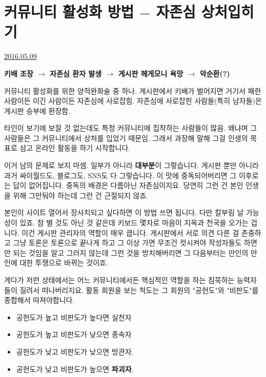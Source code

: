 
\section{커뮤니티 활성화 방법 $-$ 자존심 상처입히기}
\href{https://www.kockoc.com/Apoc/766833}{2016.05.09}

\vspace{5mm}

\textbf{키배 조장 $\rightarrow$ 자존심 환자 발생 $\rightarrow$ 게시판 헤게모니 욕망 $\rightarrow$ 악순환(?)}
\vspace{5mm}

커뮤니티 활성화를 위한 양적완화술 중 하나.
게시판에서 키배가 벌어지면 거기서 패한 사람이든 이긴 사람이든 자존심에 사로잡힘.
자존심에 사로잡힌 사람들(특히 남자들)은 게시판 승부에 환장함.
\vspace{5mm}

타인이 보기에 보잘 것 없는데도 특정 커뮤니티에 집착하는 사람들이 많음.
왜냐며 그 사람들은 그 커뮤니티에서 상처를 입었기 때문임.
그래서 과장해 말해 그걸 인생의 목표로 삼고 온라인 활동을 하기 시작합니다.
\vspace{5mm}

이거 남의 문제로 보지 마셈. 일부가 아니라 \textbf{대부분}이 그렇습니다.
게시판 뿐만 아니라 과거 싸이월드도, 블로그도, SNS도 다 그렇습니다.
이 맛에 중독되어버리면 그 이후로는 답이 없어집니다. 중독의 배경은 다름아닌 자존심이지요.
당연히 그런 건 본인 인생을 위해 그만둬야 하는데 그런 건 근절되지 않죠.
\vspace{5mm}

본인이 사이트 열어서 장사치되고 싶다하면 이 방법 쓰면 됩니다. 다만 칼부림 날 가능성이 있죠.
참 별 것도 아닌 것 같은데 키보드 몇자로 마음이 지옥과 천국을 오가는 겁니다.
이건 게시판 관리자의 역할이 매우 큽니다.
게시판에서 서로 의견 다른 걸 존중하고 그냥 토론은 토론으로 끝나게 하고 그 이상 가면 무조건 컷시켜야
작성자들도 하면 안 되는 것임을 알고 그러지 않는데
그런 것을 방치해버리면 그 다음부터는 만인의 만인에 대한 투쟁으로 바뀌는 것이죠.
\vspace{5mm}

게다가 저런 상태에서는 어느 커뮤니티에서든 핵심적인 역할을 하는 침묵하는 능력자들이 질려서 떠나버리지요.
활동 회원을 보는 척도는 그 회원의 "공헌도"와 "비판도"를 종합해서 따져야합니다.
\begin{itemize}
    \item[] 공헌도가 높고 비판도가 높다면 실천자
    \item[] 공헌도가 높고 비판도가 낮으면 종속자
    \item[] 공헌도가 낮고 비판도가 낮으면 방관자.
    \item[] 공헌도가 낮고 비판도가 높으면 \textbf{파괴자}.
\end{itemize}
\vspace{5mm}

